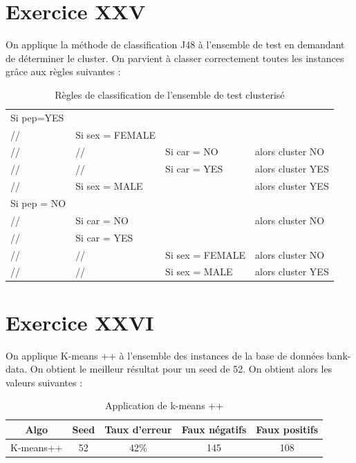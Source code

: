 \documentclass[a4paper, 11pt]{report}
\begin{document}
        \section{Exercice XXV}
        On applique la méthode de classification J48 à l'ensemble de test en demandant de déterminer le cluster. On parvient à classer correctement toutes les instances grâce aux règles suivantes : 
        \begin{table}[h!]
        \centering
        \begin{tabular}{l l l l}
        Si pep=YES & & & \\
         // & Si sex = FEMALE & & \\
         // & // & Si car = NO & alors cluster NO \\
         // & // & Si car = YES & alors cluster YES \\
         // & Si sex = MALE & & alors cluster YES \\
        Si pep = NO & & & \\
         // & Si car = NO & & alors cluster NO \\
         // & Si car = YES & & \\
         // & // & Si sex = FEMALE & alors cluster NO \\
         // & // & Si sex = MALE & alors cluster YES\\
        \end{tabular}
        \caption{Règles de classification de l'ensemble de test clusterisé}
        \label{tab:exo25}
        \end{table}
        
        \section{Exercice XXVI}
        On applique K-means ++ à l'ensemble des instances de la base de données bank-data.
        On obtient le meilleur résultat pour un seed de 52. On obtient alors les valeurs suivantes :
        \begin{table}[h!]
        \centering
        \begin{tabular}{| c | c | c | c | c |}
        \hline
         Algo & Seed & Taux d'erreur & Faux négatifs & Faux positifs  \\
         \hline
         K-means++ & 52 & 42\% & 145 & 108 \\
         \hline
        \end{tabular}
        \caption{Application de k-means ++}
        \label{tab:exo26}
        \end{table}
        
\end{document}
